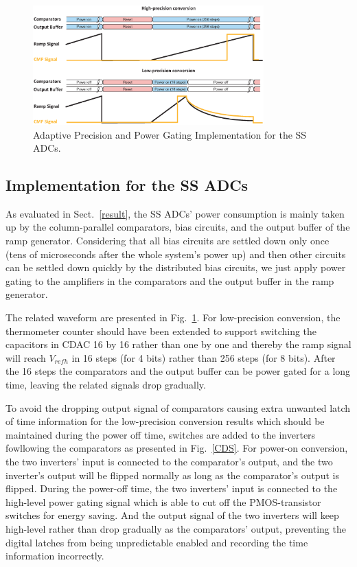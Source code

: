 \begin{figure}[htbp]
	\centerline{\includegraphics[width=3.5in]{./Figures/SS_pg.eps}}
	\caption{Adaptive Precision and Power Gating Implementation for the SS ADCs.}
	\label{SS_pg}
\end{figure}  

\subsection{Implementation for the SS ADCs}

As evaluated in Sect.~\ref{result}, the SS ADCs’ power consumption is mainly taken up by the column-parallel comparators, bias circuits, and the output buffer of the ramp generator. 
Considering that all bias circuits are settled down only once (tens of microseconds after the whole system's power up) and then other circuits can be settled down quickly by the distributed 
bias circuits, we just apply power gating to the amplifiers in the comparators and the output buffer in the ramp generator.

The related waveform are presented in Fig.~\ref{SS_pg}. For low-precision conversion, the thermometer counter should have been extended to support switching the capacitors in CDAC 16 by 16 
rather than one by one and thereby the ramp signal will reach $V_{refh}$ in 16 steps (for 4 bits) rather than 256 steps (for 8 bits). After the 16 steps the comparators and the output buffer 
can be power gated for a long time, leaving the related signals drop gradually.

To avoid the dropping output signal of comparators causing extra unwanted latch of time information for the low-precision conversion results which should be maintained during the power off time, switches are added to the inverters fowllowing the comparators as presented in Fig.~\ref{CDS}. For power-on conversion, the two inverters' input is connected to the comparator's output, and the two inverter's output will be flipped normally as long as the comparator's output is flipped. During the power-off time, the two inverters' input is connected to the high-level power gating signal which is able to cut off the PMOS-transistor switches for energy saving. And the output signal of the two inverters will keep high-level rather than drop gradually as the comparators' output, preventing the digital latches from being unpredictable enabled and recording the time information incorrectly.

